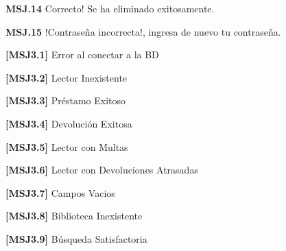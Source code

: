 	\begin{Citemize}
	\item {\bf MSJ.14} Correcto! Se ha eliminado exitosamente.
	\end{Citemize}
	
	\begin{Citemize}
	\item {\bf MSJ.15} !Contraseña incorrecta!, ingresa de nuevo tu contraseña.
	\end{Citemize}

	\begin{Citemize}
	\item {\bf [MSJ3.1]} Error al conectar a la BD
	\end{Citemize}

	\begin{Citemize}
	\item {\bf [MSJ3.2]} Lector Inexistente
	\end{Citemize}
	
	\begin{Citemize}
	\item {\bf [MSJ3.3]} Préstamo Exitoso
	\end{Citemize}
	
	\begin{Citemize}
	\item {\bf [MSJ3.4]} Devolución Exitosa
	\end{Citemize}
	
	\begin{Citemize}
	\item {\bf [MSJ3.5]} Lector con Multas
	\end{Citemize}
	
	\begin{Citemize}
	\item {\bf [MSJ3.6]} Lector con Devoluciones Atrasadas
	\end{Citemize}
	
	\begin{Citemize}
	\item {\bf [MSJ3.7]} Campos Vacios
	\end{Citemize}
	
	\begin{Citemize}
	\item {\bf [MSJ3.8]} Biblioteca Inexistente
	\end{Citemize}
	
	\begin{Citemize}
	\item {\bf [MSJ3.9]} Búsqueda Satisfactoria
	\end{Citemize}
	

